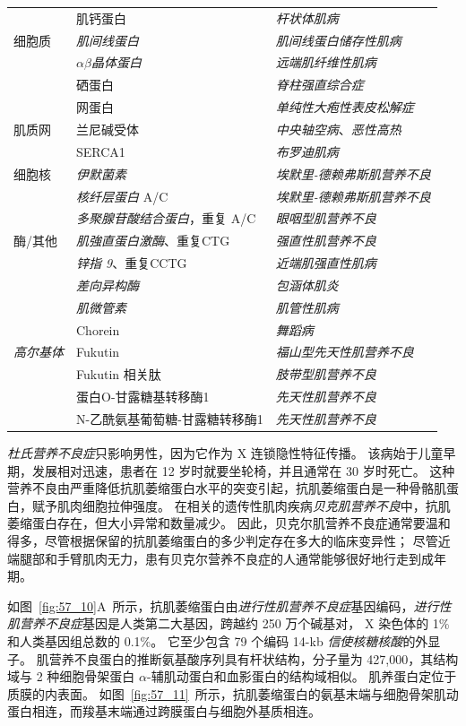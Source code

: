 \begin{table}[htbp]
\begin{tabular}{lll}
		 & 肌钙蛋白 & \textit{杆状体肌病} \\
		细胞质 & \textit{肌间线蛋白} & \textit{肌间线蛋白储存性肌病} \\
		 & $\alpha \beta$\textit{晶体蛋白} & \textit{远端肌纤维性肌病} \\
		 & 硒蛋白 & \textit{脊柱强直综合症} \\
		 & 网蛋白 & \textit{单纯性大疱性表皮松解症} \\
		肌质网 & 兰尼碱受体 & \textit{中央轴空病}、\textit{恶性高热} \\
		 & SERCA1 & \textit{布罗迪肌病} \\
		细胞核 & \textit{伊默菌素} & \textit{埃默里-德赖弗斯肌营养不良} \\
		 & \textit{核纤层蛋白} A/C & \textit{埃默里-德赖弗斯肌营养不良} \\
		 & \textit{多聚腺苷酸结合蛋白}，重复 A/C & \textit{眼咽型肌营养不良} \\
		酶/其他 & \textit{肌強直蛋白激酶}、重复CTG & \textit{强直性肌营养不良} \\
		 & \textit{锌指 9}、重复CCTG & \textit{近端肌强直性肌病} \\
		 & \textit{差向异构酶} & \textit{包涵体肌炎} \\
		 & \textit{肌微管素} & \textit{肌管性肌病} \\
		 & Chorein & \textit{舞蹈病} \\
		\textit{高尔基体} & Fukutin & \textit{福山型先天性肌营养不良} \\
		 & Fukutin 相关肽 & \textit{肢带型肌营养不良} \\
		 & 蛋白O-甘露糖基转移酶1 & \textit{先天性肌营养不良} \\
		 & N-乙酰氨基葡萄糖-甘露糖转移酶1 & \textit{先天性肌营养不良} \\
		\bottomrule
	\end{tabular}
\end{table}


\textit{杜氏营养不良症}只影响男性，因为它作为 X 连锁隐性特征传播。
该病始于儿童早期，发展相对迅速，患者在 12 岁时就要坐轮椅，并且通常在 30 岁时死亡。
这种营养不良由严重降低抗肌萎缩蛋白水平的突变引起，抗肌萎缩蛋白是一种骨骼肌蛋白，赋予肌肉细胞拉伸强度。
在相关的遗传性肌肉疾病\textit{贝克肌营养不良}中，抗肌萎缩蛋白存在，但大小异常和数量减少。
因此，贝克尔肌营养不良症通常要温和得多，尽管根据保留的抗肌萎缩蛋白的多少判定存在多大的临床变异性；
尽管近端腿部和手臂肌肉无力，患有贝克尔营养不良症的人通常能够很好地行走到成年期。


如图~\ref{fig:57_10}A~所示，抗肌萎缩蛋白由\textit{进行性肌营养不良症}基因编码，\textit{进行性肌营养不良症}基因是人类第二大基因，跨越约 250 万个碱基对， X 染色体的 1\% 和人类基因组总数的 0.1\%。
它至少包含 79 个编码 14-kb \textit{信使核糖核酸}的外显子。
肌营养不良蛋白的推断氨基酸序列具有杆状结构，分子量为 427,000，其结构域与 2 种细胞骨架蛋白 $ \alpha $-辅肌动蛋白和血影蛋白的结构域相似。
肌养蛋白定位于质膜的内表面。
如图~\ref{fig:57_11}~所示，抗肌萎缩蛋白的氨基末端与细胞骨架肌动蛋白相连，而羧基末端通过跨膜蛋白与细胞外基质相连。


